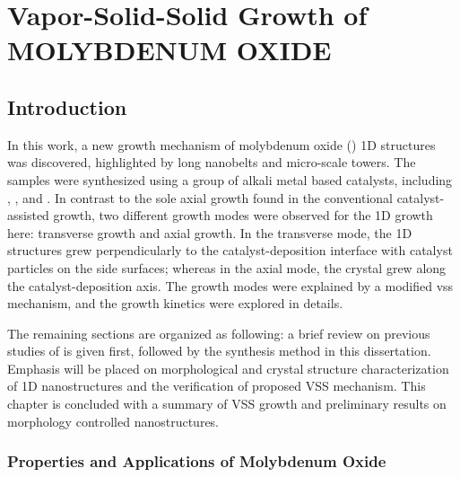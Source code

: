 \chapter{Vapor-Solid-Solid Growth of MOLYBDENUM OXIDE}

\section{Introduction}

In this work, a new growth mechanism of molybdenum oxide () 1D structures was discovered, highlighted by  long nanobelts and micro-scale towers. The samples were synthesized using a group of alkali metal based catalysts, including , , and . In contrast to the sole axial growth found in the conventional catalyst-assisted growth, two different growth modes were observed for the  1D growth here: transverse growth and axial growth. In the transverse mode, the 1D structures grew perpendicularly to the catalyst-deposition interface with catalyst particles on the side surfaces; whereas in the axial mode, the crystal grew along the catalyst-deposition axis. The growth modes were explained by a modified \gls{vss} mechanism, and the growth kinetics were explored in details. 

The remaining sections are organized as following: a brief review on previous studies of  is given first, followed by the synthesis method in this dissertation. Emphasis will be placed on morphological and crystal structure characterization of 1D  nanostructures and the verification of proposed VSS mechanism. This chapter is concluded with a summary of VSS growth and preliminary results on morphology controlled  nanostructures. 

\subsection{Properties and Applications of Molybdenum Oxide}

